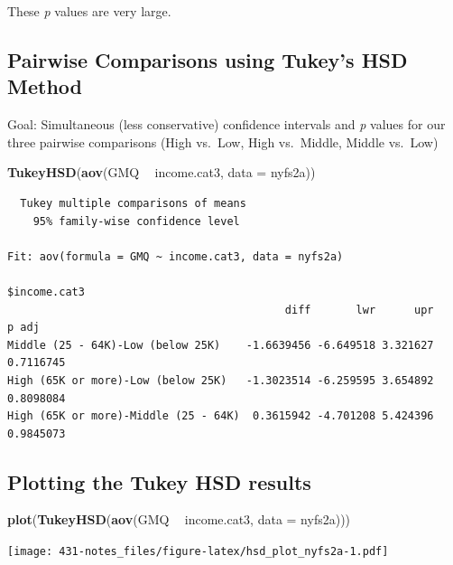 \documentclass[
]{book}
\newenvironment{Shaded}{\begin{snugshade}}{\end{snugshade}}
\newcommand{\DataTypeTok}[1]{\textcolor[rgb]{0.13,0.29,0.53}{#1}}
\newcommand{\KeywordTok}[1]{\textcolor[rgb]{0.13,0.29,0.53}{\textbf{#1}}}
\newcommand{\NormalTok}[1]{#1}
\newcommand{\OperatorTok}[1]{\textcolor[rgb]{0.81,0.36,0.00}{\textbf{#1}}}
\newcommand{\StringTok}[1]{\textcolor[rgb]{0.31,0.60,0.02}{#1}}
\begin{document}
These \emph{p} values are very large.

\hypertarget{pairwise-comparisons-using-tukeys-hsd-method}{%
\subsection{Pairwise Comparisons using Tukey's HSD Method}\label{pairwise-comparisons-using-tukeys-hsd-method}}

Goal: Simultaneous (less conservative) confidence intervals and \emph{p} values for our three pairwise comparisons (High vs.~Low, High vs.~Middle, Middle vs.~Low)

\begin{Shaded}
\begin{Highlighting}[]
\KeywordTok{TukeyHSD}\NormalTok{(}\KeywordTok{aov}\NormalTok{(GMQ }\OperatorTok{~}\StringTok{ }\NormalTok{income.cat3, }\DataTypeTok{data =}\NormalTok{ nyfs2a))}
\end{Highlighting}
\end{Shaded}

\begin{verbatim}
  Tukey multiple comparisons of means
    95% family-wise confidence level

Fit: aov(formula = GMQ ~ income.cat3, data = nyfs2a)

$income.cat3
                                           diff       lwr      upr     p adj
Middle (25 - 64K)-Low (below 25K)    -1.6639456 -6.649518 3.321627 0.7116745
High (65K or more)-Low (below 25K)   -1.3023514 -6.259595 3.654892 0.8098084
High (65K or more)-Middle (25 - 64K)  0.3615942 -4.701208 5.424396 0.9845073
\end{verbatim}

\hypertarget{plotting-the-tukey-hsd-results}{%
\subsection{Plotting the Tukey HSD results}\label{plotting-the-tukey-hsd-results}}

\begin{Shaded}
\begin{Highlighting}[]
\KeywordTok{plot}\NormalTok{(}\KeywordTok{TukeyHSD}\NormalTok{(}\KeywordTok{aov}\NormalTok{(GMQ }\OperatorTok{~}\StringTok{ }\NormalTok{income.cat3, }\DataTypeTok{data =}\NormalTok{ nyfs2a)))}
\end{Highlighting}
\end{Shaded}

\texttt{[image: 431-notes\_files/figure-latex/hsd\_plot\_nyfs2a-1.pdf]}
\end{document}
